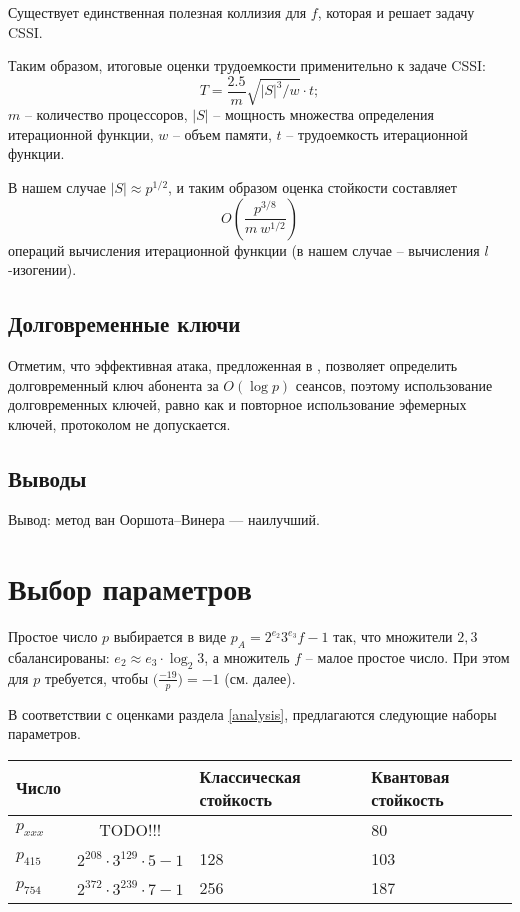 \documentclass[a4paper,12pt]{article}
\theoremstyle{definition}
\begin{document}
Существует единственная полезная коллизия для $f$, которая и решает задачу CSSI.

Таким образом, итоговые оценки трудоемкости применительно к задаче CSSI:
\begin{equation}
T=\frac{2.5}{m}\sqrt{|S|^3/w}\cdot t;
\end{equation}
$m$ -- количество процессоров, $|S|$ -- мощность множества определения итерационной функции, $w$ -- объем памяти, $t$ -- трудоемкость итерационной функции.

В нашем случае $|S|\approx p^{1/2}$, и таким образом оценка стойкости составляет
\begin{equation} 
O\left(\frac{p^{3/8}}{m\ w^{1/2}}\right)
\end{equation}
операций вычисления итерационной функции (в нашем случае -- вычисления $l$-изогении).

\subsection*{Долговременные ключи}

Отметим, что эффективная атака, предложенная в \cite{sec}, позволяет определить долговременный ключ абонента за $O(\log p)$ сеансов, поэтому использование долговременных ключей,
равно как и повторное использование эфемерных ключей, протоколом не допускается.

\subsection*{Выводы}

Вывод: метод ван Ооршота--Винера --- наилучший.


\section{Выбор параметров}

Простое число  $p$ выбирается в виде $p_A=2^{e_2}3^{e_3}f-1$ так, что множители $2,3$ сбалансированы:  $e_2\approx e_3 \cdot \log_2 3$, а множитель $f$ -- малое простое число. При этом для $p$ требуется, чтобы
$\big(\frac{-19}{p}\big) = -1$ (см. далее).

В соответствии с оценками раздела \ref{analysis}, предлагаются следующие наборы параметров. %

\begin{center}
 \begin{tabular}{|l|c|p{3cm}|p{3cm}|}
 \hline
 Число & & Классическая стойкость & Квантовая стойкость \\
 \hline
 $p_{xxx}$ & TODO!!!  &   & 80 \\
 \hline
 $p_{415}$ & $2^{208}\cdot 3^{129} \cdot 5 - 1$ & 128 & 103 \\
 \hline 
 $p_{754}$ & $2^{372} \cdot 3^{239} \cdot 7 - 1$ & 256 & 187\\
 \hline
 \end{tabular}

\end{center}
\end{document}
